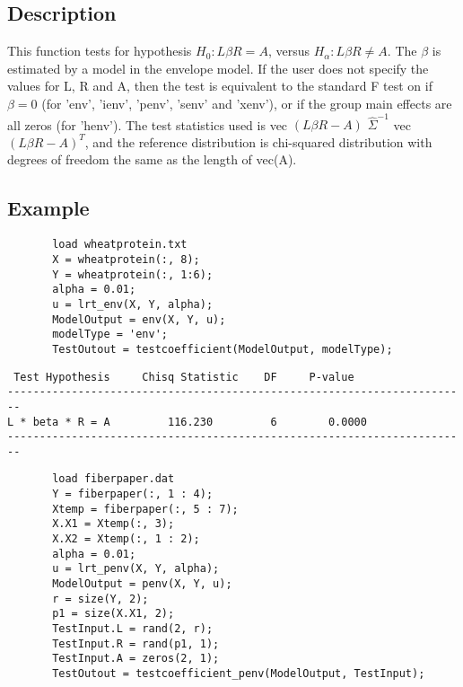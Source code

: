 \documentclass[a4paper,11pt,openany]{memoir}
\begin{document}
\subsection*{Description}

\begin{par}
This function tests for hypothesis $H_0: L\beta R = A$, versus $H_\alpha: L\beta R\neq A$.  The $\beta$ is estimated by a model in the envelope model.  If the user does not specify the values for L, R and A, then the test is equivalent to the standard F test on if $\beta = 0$ (for 'env', 'ienv', 'penv', 'senv' and 'xenv'), or if the group main effects are all zeros (for 'henv').  The test statistics used is vec $(L\beta R - A)$ $\hat{\Sigma}^{-1}$ vec $(L\beta R - A)^{T}$, and the reference distribution is chi-squared distribution with degrees of freedom the same as the length of vec(A).
\end{par} \vspace{1em}


\subsection*{Example}


\begin{verbatim}       load wheatprotein.txt
       X = wheatprotein(:, 8);
       Y = wheatprotein(:, 1:6);
       alpha = 0.01;
       u = lrt_env(X, Y, alpha);
       ModelOutput = env(X, Y, u);
       modelType = 'env';
       TestOutout = testcoefficient(ModelOutput, modelType);\end{verbatim}
         \color{lightgray}\ttfamily \begin{verbatim}
 Test Hypothesis     Chisq Statistic    DF     P-value
------------------------------------------------------------------------
L * beta * R = A         116.230         6        0.0000
------------------------------------------------------------------------
\end{verbatim} \rmfamily
\color{black}   
\begin{verbatim}       load fiberpaper.dat
       Y = fiberpaper(:, 1 : 4);
       Xtemp = fiberpaper(:, 5 : 7);
       X.X1 = Xtemp(:, 3);
       X.X2 = Xtemp(:, 1 : 2);
       alpha = 0.01;
       u = lrt_penv(X, Y, alpha);
       ModelOutput = penv(X, Y, u);
       r = size(Y, 2);
       p1 = size(X.X1, 2);
       TestInput.L = rand(2, r);
       TestInput.R = rand(p1, 1);
       TestInput.A = zeros(2, 1);
       TestOutout = testcoefficient_penv(ModelOutput, TestInput);\end{verbatim}
    
\end{document}
